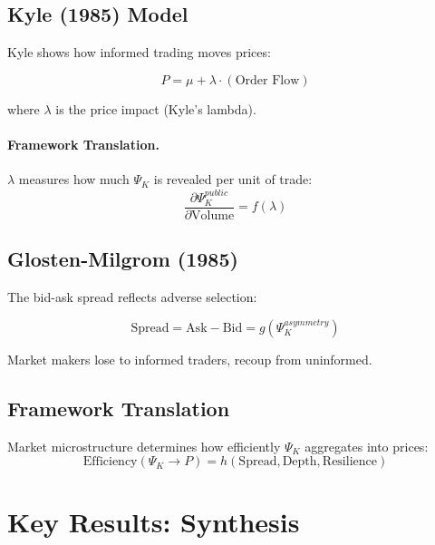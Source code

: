 \subsection{Kyle (1985) Model}

Kyle shows how informed trading moves prices:

\begin{equation}
\boxed{
P = \mu + \lambda \cdot (\text{Order Flow})
}
\label{eq:kyle}
\end{equation}

where $\lambda$ is the price impact (Kyle's lambda).

\paragraph{Framework Translation.}
$\lambda$ measures how much $\Psi_K$ is revealed per unit of trade:
\begin{equation}
\frac{\partial \Psi_K^{public}}{\partial \text{Volume}} = f(\lambda)
\end{equation}

\subsection{Glosten-Milgrom (1985)}

The bid-ask spread reflects adverse selection:

\begin{equation}
\boxed{
\text{Spread} = \text{Ask} - \text{Bid} = g(\Psi_K^{asymmetry})
}
\label{eq:gm-spread}
\end{equation}

Market makers lose to informed traders, recoup from uninformed.

\subsection{Framework Translation}

Market microstructure determines how efficiently $\Psi_K$ aggregates into prices:
\begin{equation}
\text{Efficiency}(\Psi_K \to P) = h(\text{Spread}, \text{Depth}, \text{Resilience})
\end{equation}


\section{Key Results: Synthesis}
\label{sec:Y-results}

